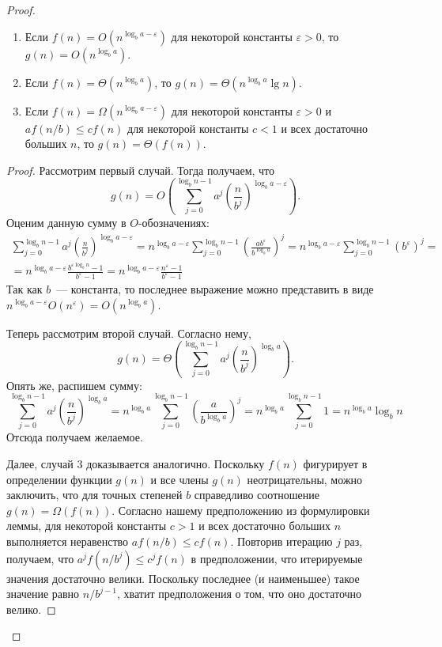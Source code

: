\documentclass[a4paper,12pt]{article}
\begin{document}
\begin{proof}
\begin{lemma}
\begin{enumerate}
			\item Если $f(n) = O(n^{\log_b a - \varepsilon})$ для некоторой константы $\varepsilon > 0$, то $g(n) = O(n^{\log_b a})$.
			\item Если $f(n) = \Theta(n^{\log_b a})$, то $g(n) = \Theta(n^{\log_b a}\lg n)$.
			\item Если $f(n) = \Omega(n^{\log_b a - \varepsilon})$ для некоторой константы $\varepsilon > 0$ и $af(n/b) \leqslant cf(n)$ для некоторой константы $c < 1$ и всех достаточно больших $n$, то $g(n) = \Theta(f(n))$.
		\end{enumerate}
	\end{lemma}
	\begin{proof}
		Рассмотрим первый случай. Тогда получаем, что \[g(n) = O\left(\sum_{j = 0}^{\log_b n - 1}a^j \left(\frac{n}{b^j}\right)^{\log_b a - \varepsilon}\right).\]
		Оценим данную сумму в $O$-обозначениях:
		\begin{multline*}
			\sum_{j = 0}^{\log_b n - 1}a^j \left(\frac{n}{b^j}\right)^{\log_b a - \varepsilon} = n^{\log_b a - \varepsilon} \sum_{j = 0}^{\log_b n - 1} \left(\frac{ab^{\varepsilon}}{b^{\log_b a}}\right)^j = n^{\log_b a - \varepsilon} \sum_{j = 0}^{\log_b n - 1} \left(b^{\varepsilon}\right)^j = \\ = n^{\log_b a - \varepsilon} \frac{b^{\varepsilon \log_b n} - 1}{b^{\varepsilon} - 1}
			= n^{\log_b a - \varepsilon} \frac{n^{\varepsilon} - 1}{b^{\varepsilon} - 1}
		\end{multline*}
		Так как $b$~--- константа, то последнее выражение можно представить в виде $n^{\log_b a - \varepsilon}O(n^{\varepsilon}) = O(n^{\log_b a})$.
		
		Теперь рассмотрим второй случай. Согласно нему, \[g(n) = \Theta\left(\sum_{j = 0}^{\log_b n - 1}a^j \left(\frac{n}{b^j}\right)^{\log_b a}\right).\]Опять же, распишем сумму:
		\[\sum_{j = 0}^{\log_b n - 1}a^j \left(\frac{n}{b^j}\right)^{\log_b a} = n^{\log_b a} \sum_{j = 0}^{\log_b n - 1}\left(\frac{a}{b^{\log_b a}}\right)^{j} = n^{\log_b a} \sum_{j = 0}^{\log_b n - 1} 1 = n^{\log_b a} \log_b n\]
		Отсюда получаем желаемое.
		
		Далее, случай 3 доказывается аналогично. Поскольку $f(n)$ фигурирует в определении функции $g(n)$ и все члены $g(n)$ неотрицательны, можно заключить, что для точных степеней $b$ справедливо соотношение $g(n) = \Omega(f(n))$. Согласно нашему предположению из формулировки леммы, для некоторой константы $c > 1$ и всех достаточно больших $n$ выполняется неравенство $af(n/b) \leqslant cf(n)$. Повторив итерацию $j$ раз, получаем, что $a^{j}f(n/b^j) \leqslant c^jf(n)$ в предположении, что итерируемые значения достаточно велики. Поскольку последнее (и наименьшее) такое значение равно $n/b^{j - 1}$, хватит предположения о том, что оно достаточно велико.
		

\end{proof}
\end{proof}
\end{document}
